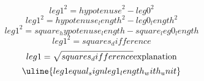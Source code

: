 \[ {leg1}^{2}={hypotenuse}^{2}-{leg0}^{2} \]
\[ {leg1}^{2}={hypotenuse_length}^{2}-{leg0_length}^{2} \]
\[ {leg1}^{2}={square_hypotenuse_length}-{square_leg0_length} \]
\[ {leg1}^{2}={squares_difference} \]
\[ {leg1}=\sqrt{\mathstrut {squares_difference}}\text{{explanation}}\]
\[ \uline{{leg1}{equal_sign}{leg1_length_with_unit}}\]